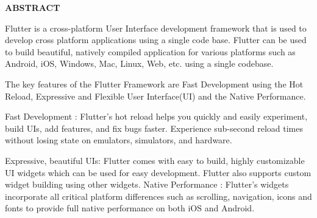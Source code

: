 \begin{center}
{\Large{\bf{ABSTRACT}}}
\end{center}

Flutter is a cross-platform User Interface development framework that is used
to develop cross platform applications using a single code base. Flutter can be
used to build beautiful, natively compiled application for various platforms such
as Android, iOS, Windows, Mac, Linux, Web, etc. using a single codebase.

The key features of the Flutter Framework are Fast Development using the
Hot Reload, Expressive and Flexible User Interface(UI) and the Native Performance.

Fast Development : Flutter’s hot reload helps you quickly and easily experiment, build UIs, add features, and fix bugs faster. Experience sub-second reload
times without losing state on emulators, simulators, and hardware.

Expressive, beautiful UIs: Flutter comes with easy to build, highly customizable UI widgets which can be used for easy development. Flutter also supports custom widget building using other widgets.
Native Performance : Flutter’s widgets incorporate all critical platform
differences such as scrolling, navigation, icons and fonts to provide full native
performance on both iOS and Android.
\clearpage